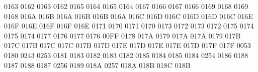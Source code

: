  0163 0162 %
 0163 0162 %
 0165 0164 %
 0165 0164 %
 0167 0166 %
 0167 0166 %
 0169 0168 %
 0169 0168 %
\setcclcuc 016A 016B 016A %
\setcclcuc 016B 016B 016A %
\setcclcuc 016C 016D 016C %
\setcclcuc 016D 016D 016C %
\setcclcuc 016E 016F 016E %
\setcclcuc 016F 016F 016E %
 0171 0170 %
 0171 0170 %
 0173 0172 %
 0173 0172 %
 0175 0174 %
 0175 0174 %
 0177 0176 %
 0177 0176 %
 00FF 0178 %
 017A 0179 %
\setcclcuc 017A 017A 0179 %
\setcclcuc 017B 017C 017B %
\setcclcuc 017C 017C 017B %
\setcclcuc 017D 017E 017D %
\setcclcuc 017E 017E 017D %
\setcclcuc 017F 017F 0053 %
 0180 0243 %
 0253 0181 %
 0183 0182 %
 0183 0182 %
 0185 0184 %
 0185 0184 %
 0254 0186 %
 0188 0187 %
 0188 0187 %
 0256 0189 %
\setcclcuc 018A 0257 018A %
\setcclcuc 018B 018C 018B %
